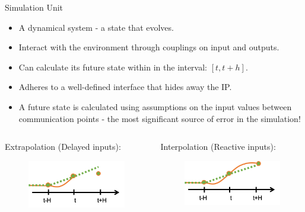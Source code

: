 \documentclass{beamer}
\begin{document}
\begin{frame}{Simulation Unit}
    \begin{itemize}
        \item A dynamical system - a state that evolves.
        \item Interact with the environment through couplings on input and outputs.
        \item Can calculate its future state within in the interval: $[t,t+h]$. 
        \item Adheres to a well-defined interface that hides away the IP.
        \item A future state is calculated using assumptions on the input values between communication points - the most significant source of error in the simulation! 
    \end{itemize}

    \begin{columns}[T] %
        \begin{column}{.48\textwidth}
            Extrapolation (Delayed inputs):
            \begin{figure}    
                \includegraphics[scale=0.6]{images/extrapolation.png}
            \end{figure}
    \end{column}%
    \hfill%
    \begin{column}{.48\textwidth}
        Interpolation (Reactive inputs):
        \begin{figure}    
            \includegraphics[scale=0.6]{images/interpolation.png}
        \end{figure}
    \end{column}%
    \end{columns}
\end{frame}
\end{document}
